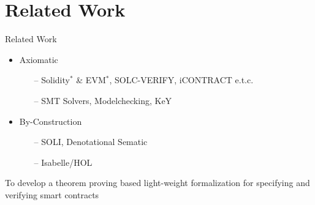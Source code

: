 \documentclass[aspectratio=169]{beamer}
\newcommand{\tikzmark}[2][]{%
  \tikz[remember picture,overlay,baseline=-.5ex] \node[#1] (#2) {};%
}
\begin{document}
\section{Related Work}
\begin{frame}{Related Work}
%
\begin{itemize}
%
\item{Axiomatic}
\begin{itemize}
\item[--] Solidity$^*$ \& EVM$^*$, SOLC-VERIFY, iCONTRACT e.t.c. 
\item[--] SMT Solvers, Modelchecking, KeY
\end{itemize}
%
%
\item{By-Construction}
\begin{itemize}
\item[--] SOLI, Denotational Sematic 
\item[--] Isabelle/HOL
\end{itemize}
%

\end{itemize}
\vspace{0.5in}
\begin{exampleblock}{}
  {\large \begin{center}To develop a theorem proving based light-weight formalization for specifying and verifying smart contracts\end{center}}
\end{exampleblock}
\end{frame}

\end{document}
